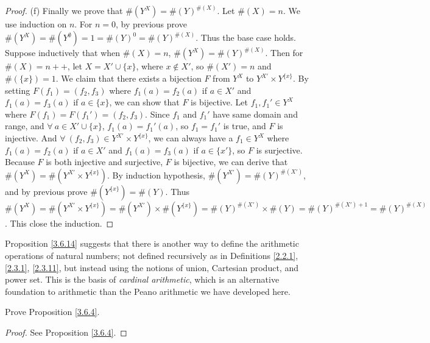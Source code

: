 \begin{proof}{(f)}
Finally we prove that \(\#(Y^X) = \#(Y)^{\#(X)}\).
Let \(\#(X) = n\).
We use induction on \(n\).
For \(n = 0\), by previous prove \(\#(Y^X) = \#(Y^{\emptyset}) = 1 = \#(Y)^0 = \#(Y)^{\#(X)}\).
Thus the base case holds.
Suppose inductively that when \(\#(X) = n\), \(\#(Y^X) = \#(Y)^{\#(X)}\).
Then for \(\#(X) = n++\), let \(X = X' \cup \{x\}\), where \(x \notin X'\), so \(\#(X') = n\) and \(\#(\{x\}) = 1\).
We claim that there exists a bijection \(F\) from \(Y^X\) to \(Y^{X'} \times Y^{\{x\}}\).
By setting \(F(f_1) = (f_2, f_3)\) where \(f_1(a) = f_2(a)\) if \(a \in X'\) and \(f_1(a) = f_3(a)\) if \(a \in \{x\}\), we can show that \(F\) is bijective.
Let \(f_1, f_1' \in Y^X\) where \(F(f_1) = F(f_1') = (f_2, f_3)\).
Since \(f_1\) and \(f_1'\) have same domain and range, and \(\forall\ a \in X' \cup \{x\}\), \(f_1(a) = f_1'(a)\), so \(f_1 = f_1'\) is true, and \(F\) is injective.
And \(\forall\ (f_2, f_3) \in Y^{X'} \times Y^{\{x\}}\), we can always have a \(f_1 \in Y^X\) where \(f_1(a) = f_2(a)\) if \(a \in X'\) and \(f_1(a) = f_3(a)\) if \(a \in \{x'\}\), so \(F\) is surjective.
Because \(F\) is both injective and surjective, \(F\) is bijective, we can derive that \(\#(Y^X) = \#(Y^{X'} \times Y^{\{x\}})\).
By induction hypothesis, \(\#(Y^{X'}) = \#(Y)^{\#(X')}\), and by previous prove \(\#(Y^{\{x\}}) = \#(Y)\).
Thus \(\#(Y^X) = \#(Y^{X'} \times Y^{\{x\}}) = \#(Y^{X'}) \times \#(Y^{\{x\}}) = \#(Y)^{\#(X')} \times \#(Y) = \#(Y)^{\#(X') + 1} = \#(Y)^{\#(X)}\).
This close the induction.
\end{proof}

\begin{remark}\label{3.6.15}
Proposition \ref{3.6.14} suggests that there is another way to define the arithmetic operations of natural numbers;
not defined recursively as in Definitions \ref{2.2.1}, \ref{2.3.1}, \ref{2.3.11}, but instead using the notions of union, Cartesian product, and power set.
This is the basis of \emph{cardinal arithmetic}, which is an alternative foundation to arithmetic than the Peano arithmetic we have developed here.
\end{remark}

\exercisesection

\begin{exercise}\label{ex 3.6.1}
Prove Proposition \ref{3.6.4}.
\end{exercise}

\begin{proof}
See Proposition \ref{3.6.4}.
\end{proof}

